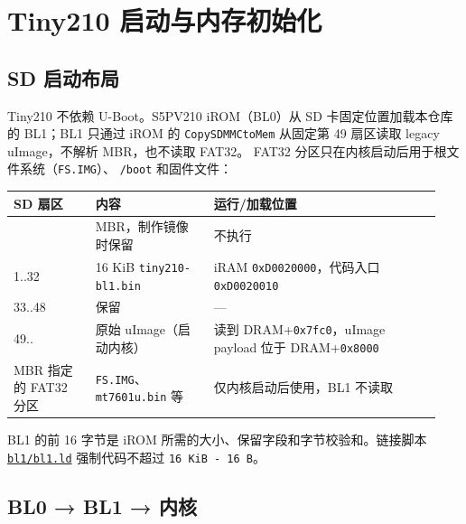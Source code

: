 \chapter{Tiny210
启动与内存初始化}\label{tiny210-ux542fux52a8ux4e0eux5185ux5b58ux521dux59cbux5316}

\section{SD 启动布局}\label{sd-ux542fux52a8ux5e03ux5c40}

Tiny210 不依赖 U-Boot。S5PV210 iROM（BL0）从 SD 卡固定位置加载本仓库的
BL1；BL1 只通过 iROM 的 \passthrough{\lstinline!CopySDMMCtoMem!}
从固定第 49 扇区读取 legacy uImage，不解析 MBR，也不读取 FAT32。
FAT32 分区只在内核启动后用于根文件系统（\passthrough{\lstinline!FS.IMG!}）、
\passthrough{\lstinline!/boot!} 和固件文件：

{\def\LTcaptype{none} %
\begin{longtable}[]{@{}p{0.18\linewidth}p{0.26\linewidth}p{0.50\linewidth}@{}}
\toprule\noalign{}
SD 扇区 & 内容 & 运行/加载位置 \\
\midrule\noalign{}
\endhead
\bottomrule\noalign{}
\endlastfoot
0 & MBR，制作镜像时保留 & 不执行 \\
1..32 & 16 KiB \passthrough{\lstinline!tiny210-bl1.bin!} & iRAM
\passthrough{\lstinline!0xD0020000!}，代码入口
\passthrough{\lstinline!0xD0020010!} \\
33..48 & 保留 & --- \\
49.. & 原始 uImage（启动内核） & 读到
DRAM+\passthrough{\lstinline!0x7fc0!}，uImage payload 位于
DRAM+\passthrough{\lstinline!0x8000!} \\
MBR 指定的 FAT32 分区 & \passthrough{\lstinline!FS.IMG!}、\passthrough{\lstinline!mt7601u.bin!}
等 & 仅内核启动后使用，BL1 不读取 \\
\end{longtable}
}

BL1 的前 16 字节是 iROM 所需的大小、保留字段和字节校验和。链接脚本
\href{../../../kernel/arch/arm/mach-s5pv210/bl1/bl1.ld}{\passthrough{\lstinline!bl1/bl1.ld!}}
强制代码不超过 \passthrough{\lstinline!16 KiB - 16 B!}。

\section{BL0 → BL1 → 内核}\label{bl0--bl1--ux5185ux6838}



